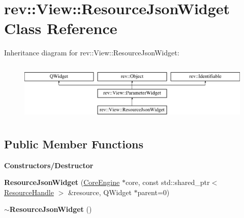\hypertarget{classrev_1_1_view_1_1_resource_json_widget}{}\section{rev\+::View\+::Resource\+Json\+Widget Class Reference}
\label{classrev_1_1_view_1_1_resource_json_widget}
Inheritance diagram for rev\+::View\+::Resource\+Json\+Widget\+:\begin{figure}[H]
\begin{center}
\leavevmode
\includegraphics[height=2.828283cm]{classrev_1_1_view_1_1_resource_json_widget}
\end{center}
\end{figure}
\subsection*{Public Member Functions}
\begin{Indent}\textbf{ Constructors/\+Destructor}\par
\begin{DoxyCompactItemize}
\item 
\mbox{\label{classrev_1_1_view_1_1_resource_json_widget_ae1501048186f60522473104ec0023942}} 
{\bfseries Resource\+Json\+Widget} (\mbox{\hyperlink{classrev_1_1_core_engine}{Core\+Engine}} $\ast$core, const std\+::shared\+\_\+ptr$<$ \mbox{\hyperlink{classrev_1_1_resource_handle}{Resource\+Handle}} $>$ \&resource, Q\+Widget $\ast$parent=0)
\item 
\mbox{\label{classrev_1_1_view_1_1_resource_json_widget_affb64a02e9131ffae95df96fd63b77d0}} 
{\bfseries $\sim$\+Resource\+Json\+Widget} ()
\end{DoxyCompactItemize}
\end{Indent}
